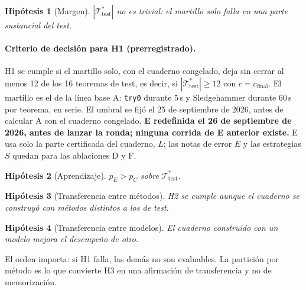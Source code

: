 \documentclass[11pt]{article}
\newtheorem{hypothesis}{Hipótesis}
\theoremstyle{remark}
\newcommand{\T}{\mathcal{T}}
\newcommand{\1}{\mathbb{1}}
\begin{document}
\begin{hypothesis}[Margen] $|\T^*_{\mathrm{test}}|$ no es trivial: el martillo solo falla en una parte sustancial del test.\end{hypothesis}

\paragraph{Criterio de decisión para H1 (prerregistrado).} H1 se cumple si el martillo solo, con el cuaderno congelado, deja sin cerrar al menos 12 de los 16 teoremas de test, es decir, si $|\T^*_{\mathrm{test}}|\ge 12$ con $c=c_{\mathrm{final}}$. El martillo es el de la línea base A: \texttt{try0} durante 5\,s y Sledgehammer durante 60\,s por teorema, en serie. El umbral se fijó el 25 de septiembre de 2026, antes de calcular A con el cuaderno congelado.
\textbf{E redefinida el 26 de septiembre de 2026, antes de lanzar la ronda; ninguna corrida de E anterior existe.} E usa solo la parte certificada del cuaderno, $L$; las notas de error $E$ y las estrategias $S$ quedan para las ablaciones D y F.
\begin{hypothesis}[Aprendizaje] $p_E>p_C$ sobre $\T^*_{\mathrm{test}}$.\end{hypothesis}
\begin{hypothesis}[Transferencia entre métodos] H2 se cumple aunque el cuaderno se construyó con métodos distintos a los de test.\end{hypothesis}
\begin{hypothesis}[Transferencia entre modelos] El cuaderno construido con un modelo mejora el desempeño de otro.\end{hypothesis}

El orden importa: si H1 falla, las demás no son evaluables. La partición por método es lo que convierte H3 en una afirmación de transferencia y no de memorización.
\end{document}
